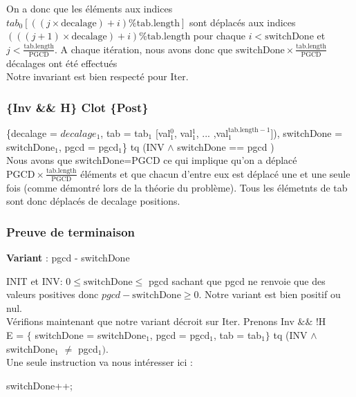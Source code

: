 On a donc que les éléments aux indices $tab_{0}[((j \times \mathrm{decalage}) + i) \% \mathrm{tab.length}]$ sont déplacés aux indices $(((j+1)\times \mathrm{decalage})+i) \% \mathrm{tab.length}$ pour chaque $i < \mathrm{switchDone}$ et $j < \frac{\mathrm{tab.length}}{\mathrm{PGCD}}$.
A chaque itération, nous avons donc que $\mathrm{switchDone} \times \frac {\mathrm{tab.length}}{\mathrm{PGCD}}$ décalages ont été effectués\\

Notre invariant est bien respecté pour Iter. 

\subsubsection*{\{Inv \&\& H\} Clot \{Post\}}
\{decalage = $decalage_{1}$, tab = tab$_{1}$ [val$_{1}^{0}$, val$_{1}^{1}$, ... ,val$_{1}^{\mathrm{tab.length-1}}$]), switchDone = switchDone$_{1}$, pgcd = pgcd$_{1}$\} tq (INV $\wedge$ switchDone == pgcd )\\

 Nous avons que switchDone=PGCD ce qui implique qu'on a déplacé
$\mathrm{PGCD}\times \frac{\mathrm{tab.length}}{\mathrm{PGCD}}$ éléments et
que chacun d'entre eux est déplacé une et une seule fois (comme démontré lors de la théorie du problème). Tous les élémetnts de tab sont donc déplacés de \og decalage \fg{}  positions. 

\subsubsection*{Preuve de terminaison}

\textbf{Variant}  : pgcd - switchDone

INIT et INV:  $0 \leq \mathrm{switchDone} \leq$ pgcd sachant que pgcd ne renvoie que des valeurs positives donc $pgcd - \mathrm{switchDone} \geq 0$. Notre variant est bien positif ou nul.\\ 

Vérifions maintenant que notre variant décroit sur Iter. Prenons Inv $\&\&$ !H \\

E = $\{$ switchDone = switchDone$_{1}$, pgcd = pgcd$_{1}$, tab = tab$_{1}\}$ tq (INV $\wedge$ switchDone$_{1}$ $\neq$ pgcd$_{1})$.\\

Une seule instruction va nous intéresser ici : 

\begin{center}
  switchDone++;\\
\end{center} 
 

